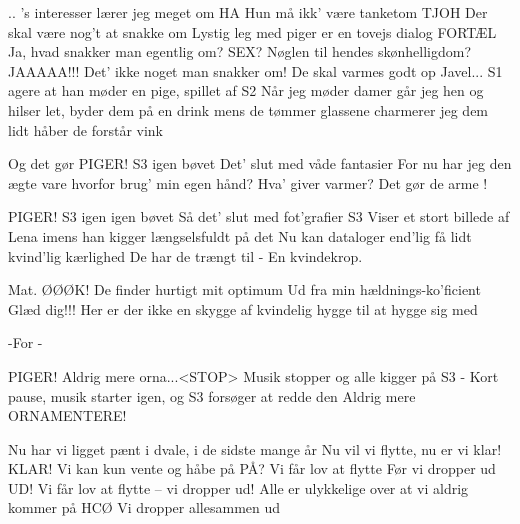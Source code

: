 \documentclass[a4paper,11pt]{article}
\begin{document}
\begin{song}
.. 's interesser lærer jeg meget om
 HA
 Hun må ikk' være tanketom
 TJOH
 Der skal være nog't at snakke om
 Lystig leg med piger er en tovejs dialog
 FORTÆL
 Ja, hvad snakker man egentlig om?
 SEX?
 Nøglen til hendes skønhelligdom?
 JAAAAA!!!
 Det' ikke noget man snakker om!
De skal varmes godt op
 Javel...
\scene S1 agere at han møder en pige, spillet af S2
 Når jeg møder damer går jeg hen og hilser let,
byder dem på en drink
mens de tømmer glassene charmerer jeg dem lidt
håber de forstår vink

 Og det gør PIGER!
\scene S3 igen bøvet
 Det' slut med våde fantasier
 For nu har jeg den ægte vare
 hvorfor brug' min egen hånd?
 Hva' giver varmer? Det gør de arme !

 PIGER!
\scene S3 igen igen bøvet
 Så det' slut med fot'grafier
\scene S3 Viser et stort billede af Lena imens han kigger længselsfuldt på det
Nu kan dataloger end'lig få lidt kvind'lig kærlighed
De har de trængt til -  En kvindekrop.

 Mat. ØØØK!
De finder hurtigt mit optimum
 Ud fra min hældnings-ko'ficient
 Glæd dig!!!
 Her er der ikke en skygge af kvindelig hygge til at hygge sig med

 -For -
 
 PIGER!
Aldrig mere orna...<STOP>
\scene Musik stopper og alle kigger på S3 - Kort pause, musik starter igen, og S3 forsøger at redde den
 Aldrig mere ORNAMENTERE!

 Nu har vi ligget pænt i dvale, i de sidste mange år
 Nu vil vi flytte, nu er vi klar!
 KLAR!
 Vi kan kun vente og håbe på
 PÅ?
 Vi får lov at flytte
 Før vi dropper ud
 UD!
 Vi får lov at flytte – vi dropper ud!
\scene Alle er ulykkelige over at vi aldrig kommer på HCØ
 Vi dropper allesammen ud
\end{song}
\end{document}
